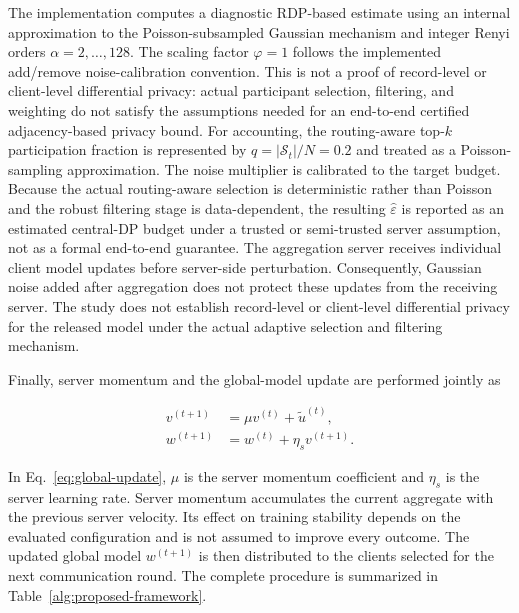 \documentclass[5p,times,numafflabel]{elsarticle}
\begin{document}
The implementation computes a diagnostic RDP-based estimate using
an internal approximation to the Poisson-subsampled Gaussian
mechanism and integer Renyi orders $\alpha=2,\ldots,128$.
The scaling factor $\varphi=1$ follows the implemented add/remove
noise-calibration convention. This is not a proof of record-level
or client-level differential privacy: actual participant selection,
filtering, and weighting do not satisfy the assumptions needed
for an end-to-end certified adjacency-based privacy bound. For accounting, the routing-aware top-\(k\)
participation fraction is represented by
\(q=|\mathcal{S}_t|/N=0.2\) and treated as a Poisson-sampling
approximation. The noise multiplier is calibrated to the target budget. Because the actual routing-aware selection is
deterministic rather than Poisson and the robust filtering stage is
data-dependent, the resulting \(\widehat{\varepsilon}\) is reported
as an estimated central-DP budget under a trusted or semi-trusted
server assumption, not as a formal end-to-end guarantee.
The aggregation server receives individual client model updates
before server-side perturbation. Consequently, Gaussian noise
added after aggregation does not protect these updates from the
receiving server. The study does not establish record-level or
client-level differential privacy for the released model under
the actual adaptive selection and filtering mechanism.

	Finally, server momentum and the global-model update are performed
	jointly as
	
	\begin{equation}
		\begin{aligned}
			v^{(t+1)}
			&=
			\mu v^{(t)}
			+
			\widetilde{u}^{(t)},\\
			w^{(t+1)}
			&=
			w^{(t)}
			+
			\eta_s v^{(t+1)}.
		\end{aligned}
		\label{eq:global-update}
	\end{equation}
	
	In Eq.~\eqref{eq:global-update}, \(\mu\) is the server momentum
	coefficient and \(\eta_s\) is the server learning rate.
	Server momentum accumulates the current aggregate with the
	previous server velocity. Its effect on training stability
	depends on the evaluated configuration and is not assumed
	to improve every outcome.
	The updated global model \(w^{(t+1)}\) is then distributed to the
	clients selected for the next communication round. The complete
	procedure is summarized in Table~\ref{alg:proposed-framework}.
	
\end{document}
